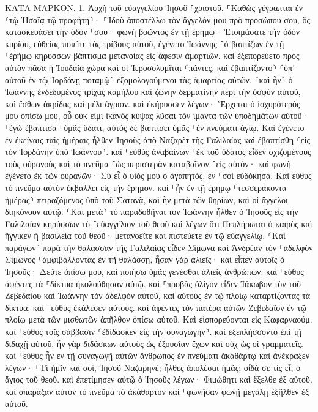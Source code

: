 \documentclass[twoside, 9pt]{extreport}
\begin{document}
ΚΑΤΑ ΜΑΡΚΟΝ.
1.
Ἀρχὴ τοῦ εὐαγγελίου Ἰησοῦ ⸀χριστοῦ. 
⸀Καθὼς γέγραπται ἐν ⸂τῷ Ἠσαΐᾳ τῷ προφήτῃ⸃· ⸀Ἰδοὺ ἀποστέλλω τὸν ἄγγελόν μου πρὸ προσώπου σου, ὃς κατασκευάσει τὴν ὁδόν ⸀σου· 
φωνὴ βοῶντος ἐν τῇ ἐρήμῳ· Ἑτοιμάσατε τὴν ὁδὸν κυρίου, εὐθείας ποιεῖτε τὰς τρίβους αὐτοῦ, 
ἐγένετο Ἰωάννης ⸀ὁ βαπτίζων ἐν τῇ ⸀ἐρήμῳ κηρύσσων βάπτισμα μετανοίας εἰς ἄφεσιν ἁμαρτιῶν. 
καὶ ἐξεπορεύετο πρὸς αὐτὸν πᾶσα ἡ Ἰουδαία χώρα καὶ οἱ Ἱεροσολυμῖται ⸂πάντες, καὶ ἐβαπτίζοντο⸃ ⸂ὑπ᾽ αὐτοῦ ἐν τῷ Ἰορδάνῃ ποταμῷ⸃ ἐξομολογούμενοι τὰς ἁμαρτίας αὐτῶν. 
⸂καὶ ἦν⸃ ὁ Ἰωάννης ἐνδεδυμένος τρίχας καμήλου καὶ ζώνην δερματίνην περὶ τὴν ὀσφὺν αὐτοῦ, καὶ ἔσθων ἀκρίδας καὶ μέλι ἄγριον. 
καὶ ἐκήρυσσεν λέγων· Ἔρχεται ὁ ἰσχυρότερός μου ὀπίσω μου, οὗ οὐκ εἰμὶ ἱκανὸς κύψας λῦσαι τὸν ἱμάντα τῶν ὑποδημάτων αὐτοῦ· 
⸀ἐγὼ ἐβάπτισα ⸀ὑμᾶς ὕδατι, αὐτὸς δὲ βαπτίσει ὑμᾶς ⸀ἐν πνεύματι ἁγίῳ. 
Καὶ ἐγένετο ἐν ἐκείναις ταῖς ἡμέραις ἦλθεν Ἰησοῦς ἀπὸ Ναζαρὲτ τῆς Γαλιλαίας καὶ ἐβαπτίσθη ⸂εἰς τὸν Ἰορδάνην ὑπὸ Ἰωάννου⸃. 
καὶ ⸀εὐθὺς ἀναβαίνων ⸀ἐκ τοῦ ὕδατος εἶδεν σχιζομένους τοὺς οὐρανοὺς καὶ τὸ πνεῦμα ⸀ὡς περιστερὰν καταβαῖνον ⸀εἰς αὐτόν· 
καὶ φωνὴ ἐγένετο ἐκ τῶν οὐρανῶν· Σὺ εἶ ὁ υἱός μου ὁ ἀγαπητός, ἐν ⸀σοὶ εὐδόκησα. 
Καὶ εὐθὺς τὸ πνεῦμα αὐτὸν ἐκβάλλει εἰς τὴν ἔρημον. 
καὶ ⸀ἦν ἐν τῇ ἐρήμῳ ⸂τεσσεράκοντα ἡμέρας⸃ πειραζόμενος ὑπὸ τοῦ Σατανᾶ, καὶ ἦν μετὰ τῶν θηρίων, καὶ οἱ ἄγγελοι διηκόνουν αὐτῷ. 
⸂Καὶ μετὰ⸃ τὸ παραδοθῆναι τὸν Ἰωάννην ἦλθεν ὁ Ἰησοῦς εἰς τὴν Γαλιλαίαν κηρύσσων τὸ ⸀εὐαγγέλιον τοῦ θεοῦ 
καὶ λέγων ὅτι Πεπλήρωται ὁ καιρὸς καὶ ἤγγικεν ἡ βασιλεία τοῦ θεοῦ· μετανοεῖτε καὶ πιστεύετε ἐν τῷ εὐαγγελίῳ. 
⸂Καὶ παράγων⸃ παρὰ τὴν θάλασσαν τῆς Γαλιλαίας εἶδεν Σίμωνα καὶ Ἀνδρέαν τὸν ⸀ἀδελφὸν Σίμωνος ⸀ἀμφιβάλλοντας ἐν τῇ θαλάσσῃ, ἦσαν γὰρ ἁλιεῖς· 
καὶ εἶπεν αὐτοῖς ὁ Ἰησοῦς· Δεῦτε ὀπίσω μου, καὶ ποιήσω ὑμᾶς γενέσθαι ἁλιεῖς ἀνθρώπων. 
καὶ ⸀εὐθὺς ἀφέντες τὰ ⸀δίκτυα ἠκολούθησαν αὐτῷ. 
καὶ ⸀προβὰς ὀλίγον εἶδεν Ἰάκωβον τὸν τοῦ Ζεβεδαίου καὶ Ἰωάννην τὸν ἀδελφὸν αὐτοῦ, καὶ αὐτοὺς ἐν τῷ πλοίῳ καταρτίζοντας τὰ δίκτυα, 
καὶ ⸀εὐθὺς ἐκάλεσεν αὐτούς. καὶ ἀφέντες τὸν πατέρα αὐτῶν Ζεβεδαῖον ἐν τῷ πλοίῳ μετὰ τῶν μισθωτῶν ἀπῆλθον ὀπίσω αὐτοῦ. 
Καὶ εἰσπορεύονται εἰς Καφαρναούμ. καὶ ⸀εὐθὺς τοῖς σάββασιν ⸂ἐδίδασκεν εἰς τὴν συναγωγήν⸃. 
καὶ ἐξεπλήσσοντο ἐπὶ τῇ διδαχῇ αὐτοῦ, ἦν γὰρ διδάσκων αὐτοὺς ὡς ἐξουσίαν ἔχων καὶ οὐχ ὡς οἱ γραμματεῖς. 
καὶ ⸀εὐθὺς ἦν ἐν τῇ συναγωγῇ αὐτῶν ἄνθρωπος ἐν πνεύματι ἀκαθάρτῳ καὶ ἀνέκραξεν 
λέγων· ⸀Τί ἡμῖν καὶ σοί, Ἰησοῦ Ναζαρηνέ; ἦλθες ἀπολέσαι ἡμᾶς; οἶδά σε τίς εἶ, ὁ ἅγιος τοῦ θεοῦ. 
καὶ ἐπετίμησεν αὐτῷ ὁ Ἰησοῦς λέγων· Φιμώθητι καὶ ἔξελθε ἐξ αὐτοῦ. 
καὶ σπαράξαν αὐτὸν τὸ πνεῦμα τὸ ἀκάθαρτον καὶ ⸀φωνῆσαν φωνῇ μεγάλῃ ἐξῆλθεν ἐξ αὐτοῦ. 
\end{document}
